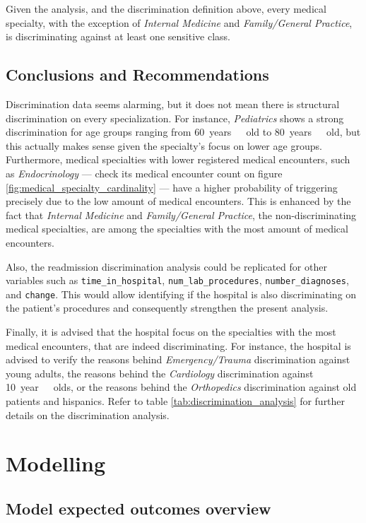 \documentclass[a4paper,11pt]{article}
\newcommand{\timeInHospital}{\texttt{time\_in\_hospital}\xspace}
\newcommand{\numLabProcedures}{\texttt{num\_lab\_procedures}\xspace}
\newcommand{\numberDiagnoses}{\texttt{number\_diagnoses}\xspace}
\newcommand{\change}{\texttt{change}\xspace}
\begin{document}
Given the analysis, and the discrimination definition above, every medical specialty, with the exception of \textit{Internal Medicine} and \textit{Family/General Practice}, is discriminating against at least one sensitive class.

\subsection{Conclusions and Recommendations}


Discrimination data seems alarming, but it does not mean there is structural discrimination on every specialization. For instance, \textit{Pediatrics} shows a strong discrimination for age groups ranging from \SI{60}{years\ old} to \SI{80}{years\ old}, but this actually makes sense given the specialty's focus on lower age groups. Furthermore, medical specialties with lower registered medical encounters, such as \textit{Endocrinology} — check its medical encounter count on figure \ref{fig:medical_specialty_cardinality} — have a higher probability of triggering precisely due to the low amount of medical encounters. This is enhanced by the fact that \textit{Internal Medicine} and \textit{Family/General Practice}, the non-discriminating medical specialties, are among the specialties with the most amount of medical encounters.

Also, the readmission discrimination analysis could be replicated for other variables such as \timeInHospital, \numLabProcedures, \numberDiagnoses, and \change. This would allow identifying if the hospital is also discriminating on the patient's procedures and consequently strengthen the present analysis.

Finally, it is advised that the hospital focus on the specialties with the most medical encounters, that are indeed discriminating. For instance, the hospital is advised to verify the reasons behind \textit{Emergency/Trauma} discrimination against young adults, the reasons behind the \textit{Cardiology} discrimination against \SI{10}{year \ olds}, or the reasons behind the \textit{Orthopedics} discrimination against old patients and hispanics. Refer to table \ref{tab:discrimination_analysis} for further details on the discrimination analysis.


\newpage
\section{Modelling}
\subsection{Model expected outcomes overview}
\end{document}
